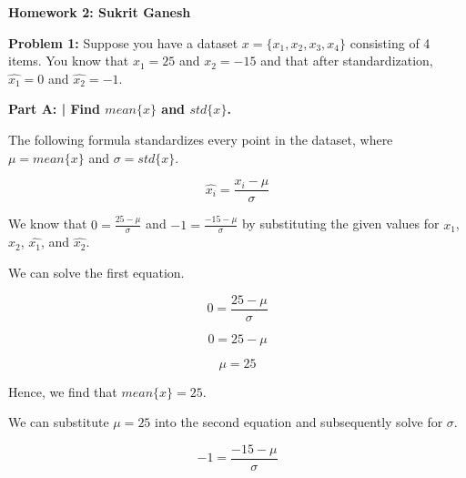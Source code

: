 \documentclass{article}
\begin{document}
 
 \begin{center}
     \Huge\textbf{Homework 2: Sukrit Ganesh}\par
 \end{center}
 
  \noindent\makebox[\linewidth]{\rule{\paperwidth}{0.4pt}}\newline
 
 \begin{center}
      \Large\textbf{Problem 1:} Suppose you have a dataset ${x}=\{x_1, x_2, x_3, x_4\}$ consisting of 4 items. You know that $x_1 = 25$ and $x_2 = -15$ and that after standardization, $\hat{x_1} = 0$ and $\hat{x_2} = -1$. \par
 \end{center}
 
 \textbf{Part A: | Find $mean\{x\}$ and $std\{x\}$.}\newline
 
 The following formula standardizes every point in the dataset, where $\mu = mean\{x\}$ and $\sigma = std\{x\}$.
 
 \begin{displaymath}
 \hat{x_i} = \frac{x_i - \mu}{\sigma}  
 \end{displaymath}
 
 We know that $0 = \frac{25 - \mu}{\sigma}$ and $-1 = \frac{-15 - \mu}{\sigma}$ by substituting the given values for $x_1$, $x_2$, $\hat{x_1}$, and $\hat{x_2}$.\newline
 
 We can solve the first equation.
 
 \begin{displaymath}
 0 = \frac{25 - \mu}{\sigma}
 \end{displaymath}
 
 \begin{displaymath}
 0 = 25 - \mu
 \end{displaymath}
 
 \begin{displaymath}
 \mu = 25
 \end{displaymath}
 
 Hence, we find that $mean\{x\} = 25$.\newline
 
 We can substitute $\mu = 25$ into the second equation and subsequently solve for $\sigma$.
 
 \begin{displaymath}
 -1 = \frac{-15 - \mu}{\sigma}
 \end{displaymath}
 
\end{document}
